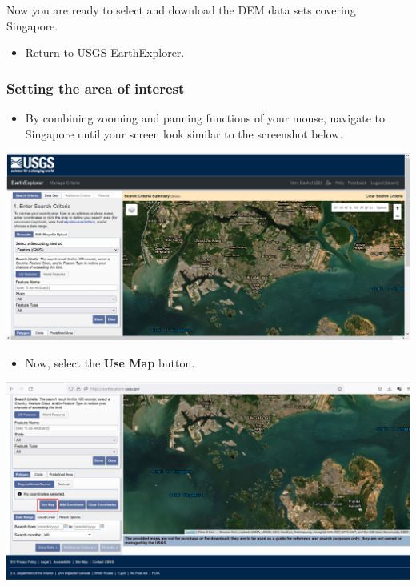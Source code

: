 \documentclass[
  letterpaper,
  DIV=11,
  numbers=noendperiod]{scrreprt}
\providecommand{\tightlist}{%
  \setlength{\itemsep}{0pt}\setlength{\parskip}{0pt}}\usepackage{longtable,booktabs,array}
\begin{document}
Now you are ready to select and download the DEM data sets covering
Singapore.

\begin{itemize}
\tightlist
\item
  Return to USGS EarthExplorer.
\end{itemize}

\hypertarget{setting-the-area-of-interest}{%
\subsubsection{Setting the area of
interest}\label{setting-the-area-of-interest}}

\begin{itemize}
\tightlist
\item
  By combining zooming and panning functions of your mouse, navigate to
  Singapore until your screen look similar to the screenshot below.
\end{itemize}

\includegraphics{./img06/image24.jpg}

\begin{itemize}
\tightlist
\item
  Now, select the \textbf{Use Map} button.
\end{itemize}

\includegraphics{./img06/image25.jpg}
\end{document}
